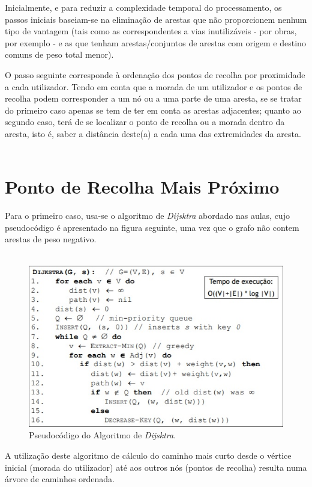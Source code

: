 \documentclass[article, a4paper, 12pt, oneside]{memoir}
\begin{document}
Inicialmente, e para reduzir a complexidade temporal do processamento, os passos iniciais baseiam-se na eliminação de arestas que não proporcionem nenhum tipo de vantagem (tais como as correspondentes a vias inutilizáveis - por obras, por exemplo - e as que tenham arestas/conjuntos de arestas com origem e destino comuns de peso total menor).

O passo seguinte corresponde à ordenação dos pontos de recolha por proximidade a cada utilizador. Tendo em conta que a morada de um utilizador e os pontos de recolha podem corresponder a um nó ou a uma parte de uma aresta, se se tratar do primeiro caso apenas se tem de ter em conta as arestas adjacentes; quanto ao segundo caso, terá de se localizar o ponto de recolha ou a morada dentro da aresta, isto é, saber a distância deste(a) a cada uma das extremidades da aresta.\\\

\section{Ponto de Recolha Mais Próximo}

Para o primeiro caso, usa-se o algoritmo de \textit{Dijsktra} abordado nas aulas, cujo pseudocódigo é apresentado na figura seguinte, uma vez que o grafo não contem arestas de peso negativo. \\\

\begin{figure}[h!]
  \centerline{\includegraphics[scale=1]{Dijkstra_pseudocode.jpg}}
  \caption{Pseudocódigo do Algoritmo de \textit{Dijsktra}.}
\end{figure}

A utilização deste algoritmo de cálculo do caminho mais curto desde o vértice inicial (morada do utilizador) até aos outros nós (pontos de recolha) resulta numa árvore de caminhos ordenada.
\end{document}
